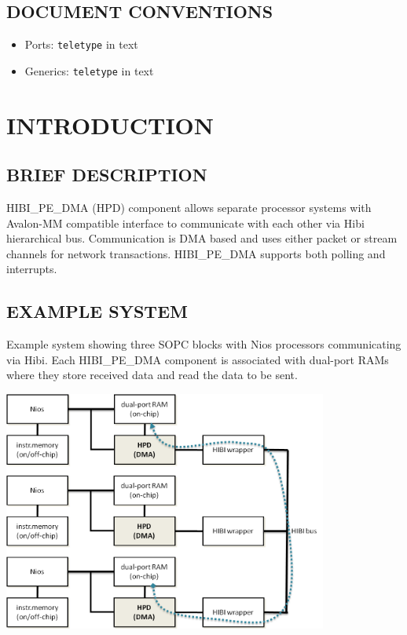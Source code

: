 \documentclass[a4paper,10pt,oneside,final]{article}
\begin{document}
\subsection{DOCUMENT CONVENTIONS}


\begin{itemize}
\item Ports: \texttt{teletype} in text
\item Generics: \texttt{teletype} in text
\end{itemize}



\newpage
\section{INTRODUCTION}

\subsection{BRIEF DESCRIPTION}

HIBI\_PE\_DMA (HPD) component allows separate processor systems with
Avalon-MM compatible interface to communicate with each other via Hibi
hierarchical bus. Communication is DMA based and uses either packet or
stream channels for network transactions. HIBI\_PE\_DMA supports both
polling and interrupts.

\subsection{EXAMPLE SYSTEM}

Example system showing three SOPC blocks with Nios processors
communicating via Hibi. Each HIBI\_PE\_DMA component is associated
with dual-port RAMs where they store received data and read the data
to be sent.

\begin{center}  
  \includegraphics[width=0.8\textwidth]{pic/example_system.png}
  \label{fig:example_system}
\end{center}
\end{document}
